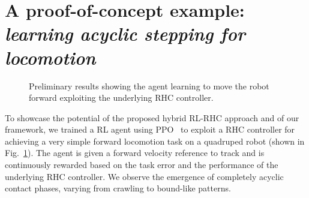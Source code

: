 \section{A proof-of-concept example: \textnormal{\textit{learning acyclic stepping for locomotion}}}
\begin{figure}[t]
	\centering
	\caption{Preliminary results showing the agent learning to move the robot forward exploiting the underlying RHC controller.}
	\label{fig:proof}
\end{figure}
To showcase the potential of the proposed hybrid RL-RHC approach and of our framework, we trained a RL agent using PPO~\cite{rl:schulman2017proximal} to exploit a RHC controller for achieving a very simple forward locomotion task on a quadruped robot (shown in Fig.~\ref{fig:proof}). The agent is given a forward velocity reference to track and is continuously rewarded based on the task error and the performance of the underlying RHC controller. We observe the emergence of completely acyclic contact phases, varying from crawling to bound-like patterns.
 